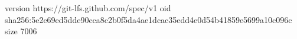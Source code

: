 version https://git-lfs.github.com/spec/v1
oid sha256:5e2e69ed5dde90cca8c2b0f5da4ae1dcac35edd4e0d54b41859e5699a10c096c
size 7006

